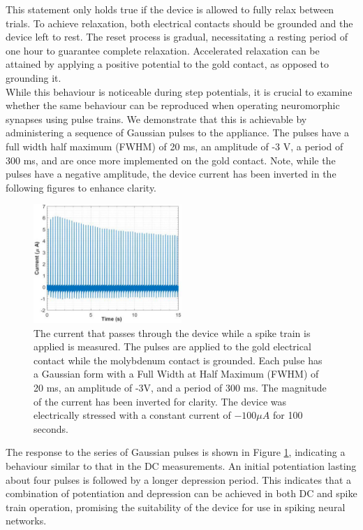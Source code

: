 \noindent This statement only holds true if the device is allowed to fully relax between trials. To achieve relaxation, both electrical contacts should be grounded and the device left to rest. The reset process is gradual, necessitating a resting period of one hour to guarantee complete relaxation. Accelerated relaxation can be attained by applying a positive potential to the gold contact, as opposed to grounding it.\\

\noindent While this behaviour is noticeable during step potentials, it is crucial to examine whether the same behaviour can be reproduced when operating neuromorphic synapses using pulse trains. We demonstrate that this is achievable by administering a sequence of Gaussian pulses to the appliance. The pulses have a full width half maximum (FWHM) of 20 ms, an amplitude of -3 V, a period of 300 ms, and are once more implemented on the gold contact. Note, while the pulses have a negative amplitude, the device current has been inverted in the following figures to enhance clarity.\\

\begin{figure}[htbp!] 
\centering    
\includegraphics[width=0.5\textwidth]{Chapter3/Figs/3g.png}
\caption[Device response to a spike train.]{The current that passes through the device while a spike train is applied is measured. The pulses are applied to the gold electrical contact while the molybdenum contact is grounded. Each pulse has a Gaussian form with a Full Width at Half Maximum (FWHM) of 20 ms, an amplitude of -3V, and a period of 300 ms. The magnitude of the current has been inverted for clarity. The device was electrically stressed with a constant current of $-100\mu A$ for 100 seconds.}
\label{fig:3g}
\end{figure}

\noindent The response to the series of Gaussian pulses is shown in Figure \ref{fig:3g}, indicating a behaviour similar to that in the DC measurements. An initial potentiation lasting about four pulses is followed by a longer depression period. This indicates that a combination of potentiation and depression can be achieved in both DC and spike train operation, promising the suitability of the device for use in spiking neural networks.\\

